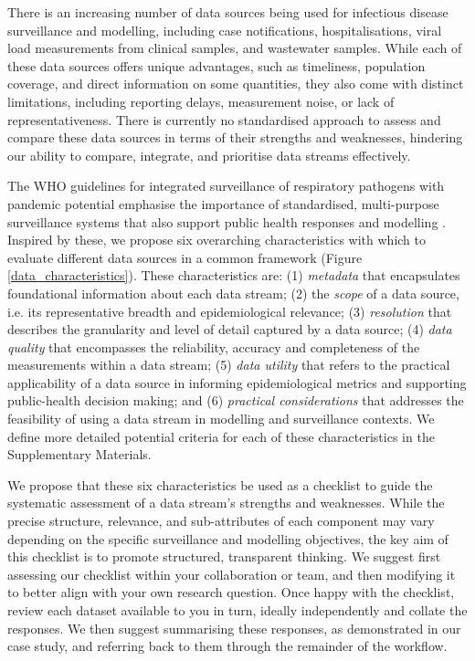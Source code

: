 \documentclass{article}
\begin{document}
There is an increasing number of data sources being used for infectious disease surveillance and modelling, including case notifications, hospitalisations, viral load measurements from clinical samples, and wastewater samples. While each of these data sources offers unique advantages, such as timeliness, population coverage, and direct information on some quantities, they also come with distinct limitations, including reporting delays,  measurement noise, or lack of representativeness. There is currently no standardised approach to assess and compare these data sources in terms of their strengths and weaknesses, hindering our ability to compare, integrate, and prioritise data streams effectively. 

The WHO guidelines for integrated surveillance of respiratory pathogens with pandemic potential emphasise the importance of standardised, multi-purpose surveillance systems that also support public health responses and modelling \citep{world2024implementing}. Inspired by these, we propose six overarching characteristics with which to evaluate different data sources in a common framework (Figure \ref{data_characteristics}).  These characteristics are: (1) \textit{metadata}  that encapsulates foundational information about each data stream; (2) the \textit{scope} of a data source, i.e. its representative breadth and epidemiological relevance; (3) \textit{resolution} that describes the granularity and level of detail captured by a data source; (4) \textit{data quality} that encompasses the reliability, accuracy and completeness of the measurements within a data stream; (5) \textit{data utility} that refers to the practical applicability of a data source in informing epidemiological metrics and supporting public-health decision making; and (6)\textit{ practical considerations} that addresses the feasibility of using a data stream in modelling and surveillance contexts. We define more detailed potential criteria for each of these characteristics in the Supplementary Materials. 

We propose that these six characteristics be used as a checklist to guide the systematic assessment of a data stream's strengths and weaknesses. While the precise structure, relevance, and sub-attributes of each component may vary depending on the specific surveillance and modelling objectives, the key aim of this checklist is to promote structured, transparent thinking. We suggest first assessing our checklist within your collaboration or team,  and then modifying it to better align with your own research question. Once happy with the checklist, review each dataset available to you in turn, ideally independently and collate the responses. We then suggest summarising these responses, as demonstrated in our case study, and referring back to them through the remainder of the workflow.
\end{document}
